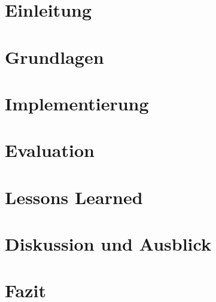 \mainmatter

\chapter{Einleitung}\label{chap:introduction}


\chapter{Grundlagen}\label{chap:basics}


%

\chapter{Implementierung}\label{chap:implementation}


\chapter{Evaluation}\label{chap:evaluation}


\chapter{Lessons Learned}\label{chap:lessons_learned}


\chapter{Diskussion und Ausblick}\label{chap:discussion}



\chapter{Fazit}\label{chap:conclusion}

%
